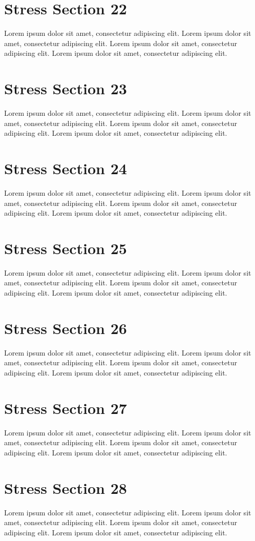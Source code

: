 \documentclass{article}
\begin{document}
\section{Stress Section 22}
Lorem ipsum dolor sit amet, consectetur adipiscing elit. Lorem ipsum dolor sit amet, consectetur adipiscing elit. Lorem ipsum dolor sit amet, consectetur adipiscing elit. Lorem ipsum dolor sit amet, consectetur adipiscing elit. \newpage
\section{Stress Section 23}
Lorem ipsum dolor sit amet, consectetur adipiscing elit. Lorem ipsum dolor sit amet, consectetur adipiscing elit. Lorem ipsum dolor sit amet, consectetur adipiscing elit. Lorem ipsum dolor sit amet, consectetur adipiscing elit. \newpage
\section{Stress Section 24}
Lorem ipsum dolor sit amet, consectetur adipiscing elit. Lorem ipsum dolor sit amet, consectetur adipiscing elit. Lorem ipsum dolor sit amet, consectetur adipiscing elit. Lorem ipsum dolor sit amet, consectetur adipiscing elit. \newpage
\section{Stress Section 25}
Lorem ipsum dolor sit amet, consectetur adipiscing elit. Lorem ipsum dolor sit amet, consectetur adipiscing elit. Lorem ipsum dolor sit amet, consectetur adipiscing elit. Lorem ipsum dolor sit amet, consectetur adipiscing elit. \newpage
\section{Stress Section 26}
Lorem ipsum dolor sit amet, consectetur adipiscing elit. Lorem ipsum dolor sit amet, consectetur adipiscing elit. Lorem ipsum dolor sit amet, consectetur adipiscing elit. Lorem ipsum dolor sit amet, consectetur adipiscing elit. \newpage
\section{Stress Section 27}
Lorem ipsum dolor sit amet, consectetur adipiscing elit. Lorem ipsum dolor sit amet, consectetur adipiscing elit. Lorem ipsum dolor sit amet, consectetur adipiscing elit. Lorem ipsum dolor sit amet, consectetur adipiscing elit. \newpage
\section{Stress Section 28}
Lorem ipsum dolor sit amet, consectetur adipiscing elit. Lorem ipsum dolor sit amet, consectetur adipiscing elit. Lorem ipsum dolor sit amet, consectetur adipiscing elit. Lorem ipsum dolor sit amet, consectetur adipiscing elit. \newpage
\end{document}
